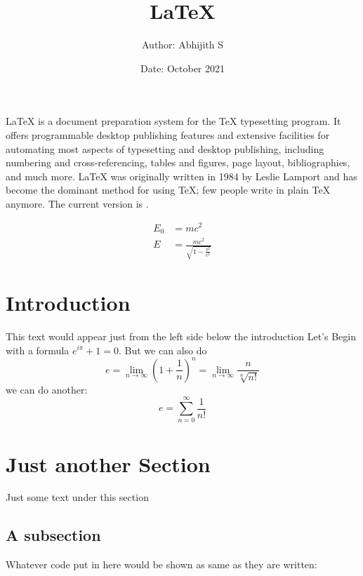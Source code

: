 \documentclass{article}     %
\title{\LaTeX{}}             %
\author{Author: Abhijith S} %
\date{Date: October 2021}   %
\begin{document}

\maketitle
  \LaTeX{} is a document preparation system for
  the \TeX{} typesetting program. It offers
  programmable desktop publishing features and
  extensive facilities for automating most
  aspects of typesetting and desktop publishing,
  including numbering and  cross-referencing,
  tables and figures, page layout,
  bibliographies, and much more. \LaTeX{} was
  originally written in 1984 by Leslie Lamport
  and has become the  dominant method for using
  \TeX; few people write in plain \TeX{} anymore.
  The current version is \LaTeXe.

  \begin{align}
    E_0 &= mc^2 \\
    E &= \frac{mc^2}{\sqrt{1-\frac{v^2}{c^2}}}
  \end{align} 



\section{Introduction}

This text would appear just from the left side below the introduction
\newline
Let's Begin with a formula  $e^{i\pi}+1 = 0$. 
\newline
But we can also do 
$$e =  \lim_{n\to\infty}\left(1+ \frac{1}{n}\right)^n = \lim_{n\to\infty}\frac{n}{\sqrt[n]{n!}}$$
we can do another: $$e = \sum_{n=0}^{\infty}\frac{1}{n!}$$

\section{Just another Section}
     Just some text under this section 
     \subsection{A subsection}
Whatever code put in here would be shown as same as they are written:
\end{document}
